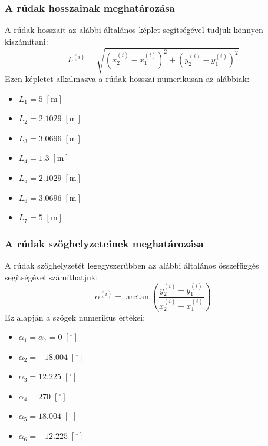 \documentclass[12pt,a4paper]{article}
\def\m{\; \left[\mathrm{m}\right]}
\def\deg{\; \left[^{\circ}\right]}
\begin{document}
\subsubsection{A rúdak hosszainak meghatározása}
A rúdak hosszait az alábbi általános képlet segítségével tudjuk
könnyen kiszámítani:
\begin{equation}
    \boxed{L^{\left(i\right)}=\sqrt{\left(x^{\left(i\right)}_2-x^{\left(i\right)}_1\right)^2+
            \left(y^{\left(i\right)}_2-y^{\left(i\right)}_1\right)^2}}
\end{equation}
Ezen képletet alkalmazva a rúdak hosszai numerikusan az alábbiak:
\begin{multicols}{4}
    \begin{itemize}
        \item $L_1=5 \m$
        \item $L_2=2.1029 \m$
    \end{itemize}
    \columnbreak
    \begin{itemize}
        \item $L_3=3.0696 \m$
        \item $L_4=1.3 \m$
    \end{itemize}
    \columnbreak
    \begin{itemize}
        \item $L_5=2.1029 \m$
        \item $L_6=3.0696 \m$
    \end{itemize}
    \columnbreak
    \begin{itemize}
        \item $L_7=5 \m$
    \end{itemize}
\end{multicols}
\subsubsection{A rúdak szöghelyzeteinek meghatározása}
A rúdak szöghelyzetét legegyszerűbben az alábbi általános összefüggés
segítségével számíthatjuk:
\begin{equation}
    \boxed{\alpha^{\left(i\right)}=
        \arctan \left( \frac{y^{\left(i\right)}_2-y^{\left(i\right)}_1}
        {x^{\left(i\right)}_2-x^{\left(i\right)}_1}\right)}
\end{equation}
Ez alapján a szögek numerikus értékei:
\begin{multicols}{3}
    \begin{itemize}
        \item $\alpha_1=\alpha_7=0 \deg$
        \item $\alpha_2=-18.004 \deg$
    \end{itemize}
    \columnbreak
    \begin{itemize}
        \item $\alpha_3=12.225 \deg$
        \item $\alpha_4=270 \deg$
    \end{itemize}
    \columnbreak
    \begin{itemize}
        \item $\alpha_5=18.004 \deg$
        \item $\alpha_6=-12.225 \deg$
    \end{itemize}
\end{multicols}
\end{document}
